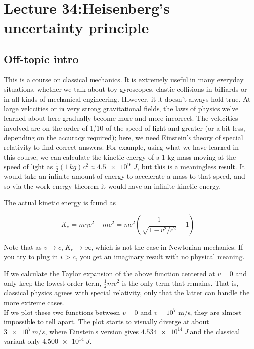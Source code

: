 \section{Lecture 34:Heisenberg's uncertainty principle}

\subsection{Off-topic intro}

This is a course on classical mechanics. It is extremely useful in many everyday situations, whether we talk about toy gyroscopes, elastic collisions in billiards or in all kinds of mechanical engineering. However, it it doesn't always hold true. At large velocities or in very strong gravitational fields, the laws of physics we've learned about here gradually become more and more incorrect. The velocities involved are on the order of 1/10 of the speed of light and greater (or a bit less, depending on the accuracy required); here, we need Einstein's theory of special relativity to find correct answers. For example, using what we have learned in this course, we can calculate the kinetic energy of a 1 kg mass moving at the speed of light as $\frac{1}{2} (\SI{1}{kg}) c^2 \approx \SI{4.5e16}{J}$, but this is a meaningless result. It would take an infinite amount of energy to accelerate a mass to that speed, and so via the work-energy theorem it would have an infinite kinetic energy.

The actual kinetic energy is found as

\begin{equation}
K_e = m \gamma c^2 - m c^2 = m c^2 \left( \frac{1}{\sqrt{1 - v^2/c^2}} - 1 \right)
\end{equation}

Note that as $v \to c$, $K_e \to \infty$, which is not the case in Newtonian mechanics. If you try to plug in $v > c$, you get an imaginary result with no physical meaning.

If we calculate the Taylor expansion of the above function centered at $v = 0$ and only keep the lowest-order term, $\frac{1}{2} m v^2$ is the only term that remains. That is, classical physics agrees with special relativity, only that the latter can handle the more extreme cases.\\
If we plot these two functions between $v = 0$ and $v = 10^7$ m/s, they are almost impossible to tell apart. The plot starts to visually diverge at about $\SI{3e7}{m/s}$, where Einstein's version gives $\SI{4.534e14}{J}$ and the classical variant only $\SI{4.500e14}{J}$.

